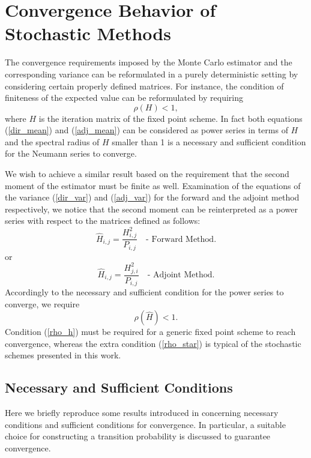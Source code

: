 \section{Convergence Behavior of Stochastic Methods}
\label{sec:convergence}

The convergence requirements imposed by the Monte Carlo estimator and
the corresponding variance can be reformulated in a purely deterministic
setting by considering certain properly defined matrices.
For instance, the condition of finiteness of the expected value can be
reformulated by requiring
\begin{equation}
 \rho(H)<1
 \label{rho_h},
\end{equation}
where $H$ is the iteration matrix of the fixed point scheme.
In fact both equations (\ref{dir_mean}) and (\ref{adj_mean}) can be considered
as
power series in terms of $H$ and the spectral radius of $H$ smaller
than 1 is a necessary and sufficient condition for the Neumann series to
converge.

We wish to achieve a similar result based on the requirement that the
second moment of the estimator must be finite as well.
Examination of the equations of the variance (\ref{dir_var}) and (\ref{adj_var})
for
the forward and the adjoint method respectively, we notice that the second
moment can be reinterpreted as a power series with respect to the matrices
defined as follows:
\[
 \hat{H}_{i,j}=\frac{H_{i,j}^2}{P_{i,j}} \quad \text{- Forward Method}.
\]
or
\[
 \hat{H}_{i,j}=\frac{H_{j,i}^2}{P_{i,j}} \quad \text{- Adjoint Method}.
\]
Accordingly to the necessary and sufficient condition for the power series to
converge, we require
\begin{equation}
 \rho(\hat{H})<1.
 \label{rho_star}
\end{equation}
Condition (\ref{rho_h}) must be required for a generic fixed point scheme to
reach convergence, whereas the extra condition (\ref{rho_star}) is typical of
the stochastic schemes presented in this work.

\subsection{Necessary and Sufficient Conditions}

Here we briefly reproduce some results introduced in \cite{MASC2013}
concerning necessary conditions and sufficient conditions for convergence.
In particular, a suitable choice for constructing a
transition probability is discussed to guarantee convergence.

